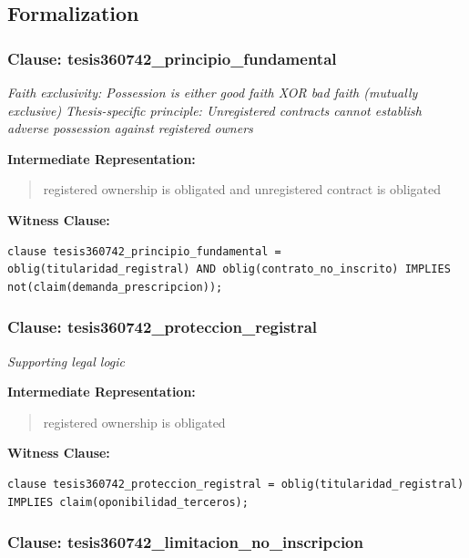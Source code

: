 \documentclass[11pt,a4paper]{article}
\begin{document}
\subsection{Formalization}

\subsubsection{Clause: tesis360742\_principio\_fundamental}

\textit{Faith exclusivity: Possession is either good faith XOR bad faith (mutually exclusive) Thesis-specific principle: Unregistered contracts cannot establish adverse possession against registered owners}

\textbf{Intermediate Representation:}

\begin{quote}
registered ownership is obligated and unregistered contract is obligated
\end{quote}

\textbf{Witness Clause:}

\begin{lstlisting}[style=witnessstyle, language=Witness]
clause tesis360742_principio_fundamental = oblig(titularidad_registral) AND oblig(contrato_no_inscrito) IMPLIES not(claim(demanda_prescripcion));
\end{lstlisting}

\subsubsection{Clause: tesis360742\_proteccion\_registral}

\textit{Supporting legal logic}

\textbf{Intermediate Representation:}

\begin{quote}
registered ownership is obligated
\end{quote}

\textbf{Witness Clause:}

\begin{lstlisting}[style=witnessstyle, language=Witness]
clause tesis360742_proteccion_registral = oblig(titularidad_registral) IMPLIES claim(oponibilidad_terceros);
\end{lstlisting}

\subsubsection{Clause: tesis360742\_limitacion\_no\_inscripcion}
\end{document}
